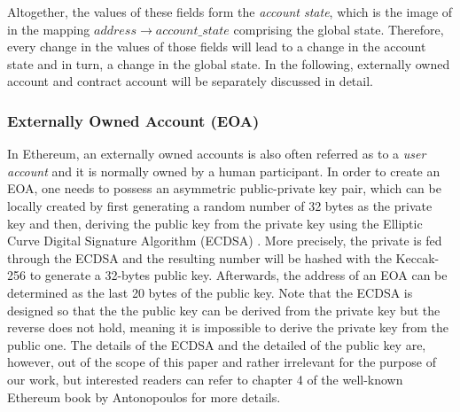 Altogether, the values of these fields form the \textit{account state}, which is the image of in the mapping $address \rightarrow account\_state$ comprising the global state. Therefore, every change in the values of those fields will lead to a change in the account state and in turn, a change in the global state. In the following, externally owned account and contract account will be separately discussed in detail.

\subsubsection{Externally Owned Account (EOA)} \label{subsubsec:eoa}

In Ethereum, an externally owned accounts is also often referred as to a \textit{user account} and it is normally owned by a human participant. In order to create an EOA, one needs to possess an asymmetric public-private key pair, which can be locally created by first  generating a random number of 32 bytes as the private key and then, deriving the public key from the private key using the Elliptic Curve Digital Signature Algorithm (ECDSA) \cite{lopez2000overview, antonopoulos2018mastering}. More precisely, the private is fed through the ECDSA and the resulting number will be hashed with the Keccak-256 to generate a 32-bytes public key. Afterwards, the address of an EOA can be determined as the last 20 bytes of the public key. Note that the ECDSA is designed so that the the public key can be derived from the private key but the reverse does not hold, meaning it is impossible to derive the private key from the public one. The details of the ECDSA and the detailed of the public key are, however, out of the scope of this paper and rather irrelevant for the purpose of our work, but interested readers can refer to chapter 4 of the well-known Ethereum book by Antonopoulos \cite{antonopoulos2018mastering} for more details.

